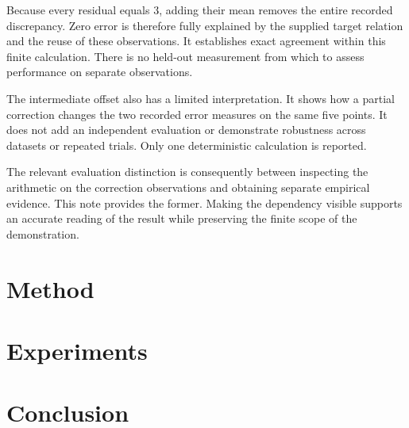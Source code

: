 \documentclass[11pt]{article}
\begin{document}
Because every residual equals \(3\), adding their mean removes the entire recorded discrepancy. Zero error is therefore fully explained by the supplied target relation and the reuse of these observations. It establishes exact agreement within this finite calculation. There is no held-out measurement from which to assess performance on separate observations.

The intermediate offset also has a limited interpretation. It shows how a partial correction changes the two recorded error measures on the same five points. It does not add an independent evaluation or demonstrate robustness across datasets or repeated trials. Only one deterministic calculation is reported.

The relevant evaluation distinction is consequently between inspecting the arithmetic on the correction observations and obtaining separate empirical evidence. This note provides the former. Making the dependency visible supports an accurate reading of the result while preserving the finite scope of the demonstration.
\section{Method}
\section{Experiments}
\section{Conclusion}


\end{document}
